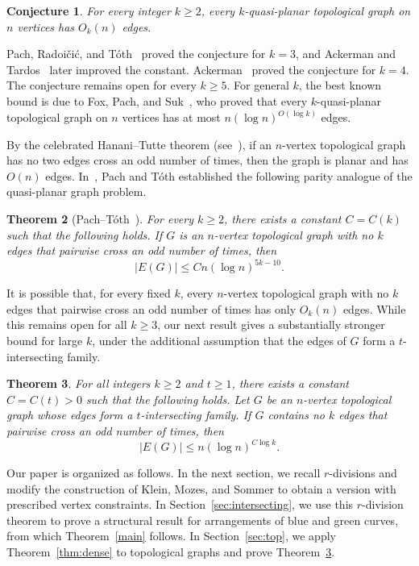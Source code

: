 \documentclass[11pt]{article}
\theoremstyle{plain}
\newtheorem{theorem}{Theorem}[section]
\newtheorem{conjecture}[theorem]{Conjecture}
\theoremstyle{definition}
\theoremstyle{remark}
\begin{document}
\begin{conjecture}
For every integer \(k\ge 2\), every \(k\)-quasi-planar topological graph on
\(n\) vertices has \(O_k(n)\) edges.
\end{conjecture}

Pach, Radoi\v{c}i\'c, and T\'oth~\cite{PRT04} proved the conjecture for
\(k=3\), and Ackerman and Tardos~\cite{AcT07} later improved the constant.
Ackerman~\cite{Ac09} proved the conjecture for \(k=4\). The conjecture remains open for
every \(k\ge 5\). For general \(k\), the best known bound is due to Fox,
Pach, and Suk~\cite{FPS2}, who proved that every \(k\)-quasi-planar
topological graph on \(n\) vertices has at most
\(n(\log n)^{O(\log k)}\) edges.

By the celebrated Hanani--Tutte theorem (see~\cite{ThomassenHT}), if an $n$-vertex topological graph has no two edges cross an odd number of times, then the graph is planar and has \(O(n)\) edges. In~\cite{PTdisjoint}, Pach and T\'oth established the following parity analogue of the quasi-planar graph problem.


\begin{theorem}[Pach--T\'oth~\cite{PTdisjoint}]
For every \(k \ge 2\), there exists a constant \(C=C(k)\) such that the following holds. If \(G\) is an \(n\)-vertex topological graph with no \(k\)  edges that pairwise cross an odd number of times, then
\[
|E(G)| \le Cn(\log n)^{5k-10}.
\]
\end{theorem}

It is possible that, for every fixed \(k\), every \(n\)-vertex topological graph with no \(k\) edges that pairwise cross an odd number of times has only \(O_k(n)\) edges. While this remains open for all $k\geq 3$, our next result gives a substantially stronger bound for large \(k\), under the additional assumption that the edges of \(G\) form a \(t\)-intersecting family. 

\begin{theorem}\label{oddcross}
For all integers \(k\ge 2\) and $t\geq 1$, there exists a constant \(C=C(t)>0\) such that the following holds. Let \(G\) be an \(n\)-vertex topological graph whose edges form a \(t\)-intersecting family. If \(G\) contains no \(k\) edges that pairwise cross an odd number of times, then
\[
|E(G)| \le n(\log n)^{C\log k}.
\]
\end{theorem}

Our paper is organized as follows.  In the next section, we recall
\(r\)-divisions and modify the construction of Klein, Mozes, and Sommer
\cite{KMS13} to obtain a version with prescribed vertex constraints.  In
Section~\ref{sec:intersecting}, we use this \(r\)-division theorem to prove
a structural result for arrangements of blue and green curves, from which
Theorem~\ref{main} follows.  In Section~\ref{sec:top}, we apply
Theorem~\ref{thm:dense} to topological graphs and prove Theorem~\ref{oddcross}.
\end{document}
